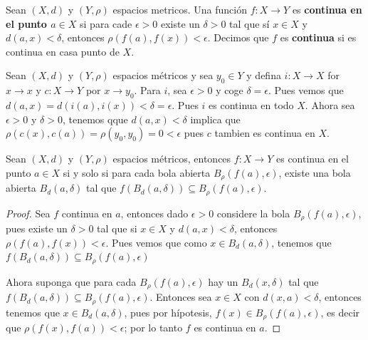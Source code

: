 \begin{definition}
    Sean $(X,d)$ y $(Y, \rho)$ espacios metricos. Una funci\'on $f:X \rightarrow Y$ es
    \textbf{continua en el punto $a \in X$} si para cade $\epsilon>0$ existe un  $\delta>0$ tal que
    s\'i  $x \in X$ y  $d(a,x)<\delta$, entonces $\rho(f(a),f(x))<\epsilon$. Decimos que $f$ es
    \textbf{continua} si es continua en casa punto de $X$.
\end{definition}

\begin{example}
    Sean $(X,d)$ y $(Y,\rho)$ espacios m\'etricos y sea $ y_0 \in Y$ y defina $i:X \rightarrow X$
    for  $x \rightarrow x$ y  $c:X \rightarrow Y$ por $x \rightarrow y_0$. Para $i$, sea
    $\epsilon>0$ y coge  $\delta=\epsilon$. Pues vemos que  $d(a,x)=d(i(a),i(x))<\delta=\epsilon$.
    Pues $i$ es continua en todo  $X$. Ahora sea  $\epsilon>0$ y  $\delta>0$, tenemos qque
    $d(a,x)<\delta$ implica que $\rho(c(x),c(a))=\rho(y_0,y_0)=0<\epsilon$ pues $c$ tambien es
    continua en  $X$.
\end{example}

\begin{theorem}\label{1.1.1}
    Sean $(X,d)$ y $(Y,\rho)$ espacios m\'etricos, entonces $f:X \rightarrow Y$ es continua en el
    punto $a \in X$ si y solo si para cada bola abierta  $B_{\rho}(f(a),\epsilon)$, existe una bola
    abierta $B_d(a,\delta)$ tal que $f(B_d(a,\delta)) \subseteq B_{\rho}(f(a),\epsilon)$.
\end{theorem}
\begin{proof}
    Sea $f$ continua en  $a$, entonces dado  $\epsilon>0$ considere la bola
    $B_{\rho}(f(a),\epsilon)$, pues existe un $\delta>0$ tal que si  $x \in X$ y  $d(a,x)<\delta$,
    entonces $\rho(f(a),f(x))<\epsilon$. Pues vemos que como $x \in B_d(a,\delta)$, tenemos que
    $f(B_d(a,\delta)) \subseteq B_{\rho}(f(a),\epsilon)$

    Ahora suponga que para cada $B_{\rho}(f(a),\epsilon)$ hay un  $B_d(x,\delta)$ tal que
    $f(B_d(a,\delta)) \subseteq B_{\rho}(f(a),\epsilon)$. Entonces sea $x \in X$ con
    $d(x,a)<\delta$, entonces tenemos que $x \in B_d(a,\delta)$, pues por h\'ipotesis, $f(x) \in
    B_{\rho}(f(a),\epsilon)$, es decir que $\rho(f(x),f(a))<\epsilon$; por lo tanto $f$ es continua
    en  $a$.
\end{proof}
